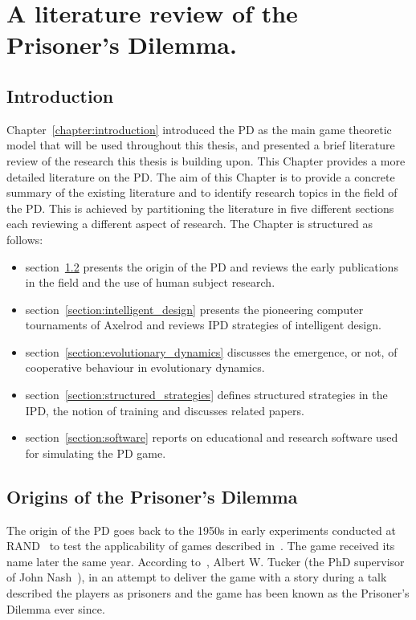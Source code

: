 \chapter{A literature review of the Prisoner's Dilemma.}\label{chapter:literature_review}

\section{Introduction}

Chapter~\ref{chapter:introduction} introduced the PD as the main
game theoretic model that will be used throughout this thesis, and presented a
brief literature review of the research this thesis is building upon. This
Chapter provides a more detailed literature on the PD.
The aim of this Chapter is to provide a concrete summary of the
existing literature and to identify research topics in the field of the PD. This is
achieved by partitioning the literature in five different sections each
reviewing a different aspect of research. The Chapter is structured as follows:

\begin{itemize}
    \item section~\ref{section:origin} presents the origin of the PD
    and reviews the early publications in the field and the use of
    human subject research.
    \item section~\ref{section:intelligent_design} presents the pioneering computer
    tournaments of Axelrod and reviews IPD strategies of intelligent design.
    \item section~\ref{section:evolutionary_dynamics} discusses
    the emergence, or not, of cooperative behaviour in evolutionary dynamics.
    \item section~\ref{section:structured_strategies} defines structured
    strategies in the IPD, the notion of training and discusses related papers.
    \item section~\ref{section:software} reports on educational and research software
    used for simulating the PD game.
\end{itemize}

\section{Origins of the Prisoner's Dilemma}\label{section:origin}

The origin of the PD goes back to the 1950s in early experiments conducted at
RAND~\cite{Flood1958} to test the applicability of games described
in~\cite{VonNeumann1944}. The game received its name later the same year.
According to~\cite{Tucker1983}, Albert W. Tucker (the PhD supervisor of John
Nash~\cite{Nash1951}), in an attempt to deliver the game with a story during a
talk described the players as prisoners and the game has been known as the
Prisoner's Dilemma ever since.


